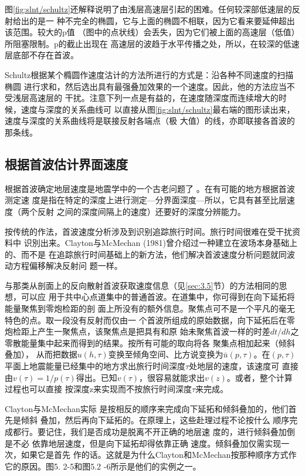 图\ref{fig:slnt/schultz}还解释说明了由浅层高速层引起的困难。任何较深部低速层的反射给出的是一
种不完全的椭圆，它与上面的椭圆不相联，因为它看来要延伸超出该范围。较大的p值
（图中的点状线）会丢失，因为它们被上面的高速层（低值）所阻塞限制。p的截止出现在
高速层的波趋于水平传播之处，所以，在较深的低速层底部不存在首波。

Schultz根据某个橢圆作速度沽计的方法所进行的方式是：沿各种不同速度的扫描椭圆
进行求和，然后选出具有最强叠加效果的一个速度。因此，他的方法应当不受浅层高速层的
干扰。注意下列一点是有益的，在速度随深度而连续增大的时候，速度与深度的关系曲线可
以直接从图\ref{fig:slnt/schultz}最右端的图形读出来，速度与深度的关系曲线将是联接反射各端点（极
大值）的线，亦即联接各首波的那条线。

\subsection{根据首波估计界面速度}
\label{sec:5.2.5}

根据首波确定地层速度是地震学中的一个古老问题了
。在有可能的地方根据首波测定速
度是指在特定的深度上进行测定---分界面深度---所以，它具有甚至比层速度（两个反射
之间的深度间隔上的速度）还要好的深度分辨能力。

按传统的作法，首波速度分析涉及到识别追踪旅行时间。旅行时间很难在受干扰资料中
识別出来。Clayton与McMechan (1981)曾介绍过一种建立在波场本身基础上的、而不是
在追踪旅行时间基础上的新方法，他们解决首波速度分析问题就同波动方程偏移解决反射问
题一样。

与那类从剖面上的反向散射首波获取速度信息（见\ref{sec:3.5}节）的方法相同的思想，可以应
用于共中心点道集中的普通首波。在道集中，你可得到在向下延拓将能量聚焦到零炮检距的剖
面上所没有的额外信息。聚焦点可不是一个平凡的毫无特色的点。取一段没有反射而仅由一
个首波所组成的原始数据，向下延拓后在零炮检距上产生一聚焦点，该聚焦点是把具有和原
始未聚焦首波一样的时差$dt/dh$之零散能量集中起来而得到的结果。按所有可能的取向将各
聚集点相加起来（倾斜叠加），
从而把数据$u(h,\tau)$变换至倾角空间、比方说变换为$\bar{u}(p,\tau)$。在$(p,\tau)$
平面上地震能量已经集中的地方求出旅行时间深度$\tau$处地层的速度，该速度可
直接由$v(\tau)=1/p(\tau)$得出。已知$v(\tau)$，很容易就能求出$v(z)$。或者，整个计算过程也可以直接
按深度z来实现而不按旅行时间深度$\tau$来完成。

Clayton与McMechan实际
是按相反的顺序来完成向下延拓和倾斜叠加的，他们首先是倾斜
叠加，然后再向下延拓的。在原理上，这些赴理过程不论按什么
顺序完成都行。要记住，我们是否成功是脱离不开正确的地层速
度的，进行倾斜叠加倒是不必
依靠地层速度，但是向下延拓却得依靠正确
速度。倾斜叠加仅需实现一次，如果它是首先
作的话。这就是为什么Clayton和McMechan按那种顺序方式作它的原因。图5.
2-5和图5.2 -6所示是他们的实例之一。

